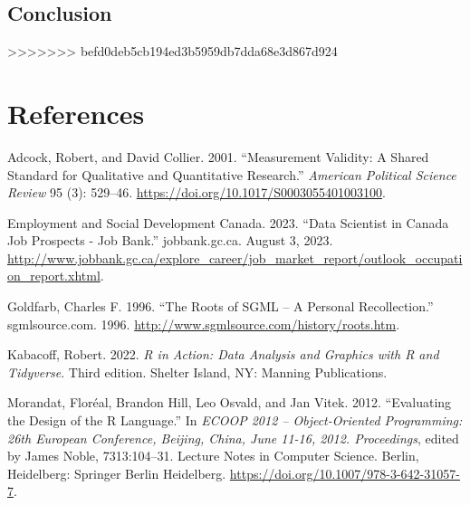 \documentclass[
  letterpaper,
]{scrbook}
\newlength{\cslhangindent}
\newlength{\cslentryspacingunit} %
\newenvironment{CSLReferences}[2] %
 {%
  \setlength{\parindent}{0pt}
  \ifodd #1
  \let\oldpar\par
  \def\par{\hangindent=\cslhangindent\oldpar}
  \fi
  \setlength{\parskip}{#2\cslentryspacingunit}
 }%
 {}
\begin{document}
\hypertarget{conclusion}{%
\section{Conclusion}\label{conclusion}}
>>>>>>> befd0deb5cb194ed3b5959db7dda68e3d867d924


\hypertarget{references}{%
\chapter*{References}\label{references}}


\hypertarget{refs}{}
\begin{CSLReferences}{1}{0}
\leavevmode{}%
Adcock, Robert, and David Collier. 2001. {``Measurement {Validity}: {A
Shared Standard} for {Qualitative} and {Quantitative Research}.''}
\emph{American Political Science Review} 95 (3): 529--46.
\url{https://doi.org/10.1017/S0003055401003100}.

\leavevmode{}%
Employment and Social Development Canada. 2023. {``Data {Scientist} in
{Canada} \textbar{} {Job} Prospects - {Job Bank}.''} {jobbank.gc.ca}.
August 3, 2023.
\url{http://www.jobbank.gc.ca/explore_career/job_market_report/outlook_occupation_report.xhtml}.

\leavevmode{}%
Goldfarb, Charles F. 1996. {``The {Roots} of {SGML} -- {A Personal
Recollection}.''} {sgmlsource.com}. 1996.
\url{http://www.sgmlsource.com/history/roots.htm}.

\leavevmode{}%
Kabacoff, Robert. 2022. \emph{R in Action: Data Analysis and Graphics
with {R} and {Tidyverse}}. Third edition. {Shelter Island, NY}: {Manning
Publications}.

\leavevmode{}%
Morandat, Floréal, Brandon Hill, Leo Osvald, and Jan Vitek. 2012.
{``Evaluating the {Design} of the {R Language}.''} In \emph{{ECOOP} 2012
-- {Object-Oriented Programming}: 26th {European Conference}, {Beijing},
{China}, {June} 11-16, 2012. {Proceedings}}, edited by James Noble,
7313:104--31. Lecture {Notes} in {Computer Science}. {Berlin,
Heidelberg}: {Springer Berlin Heidelberg}.
\url{https://doi.org/10.1007/978-3-642-31057-7}.


\end{CSLReferences}
\end{document}
